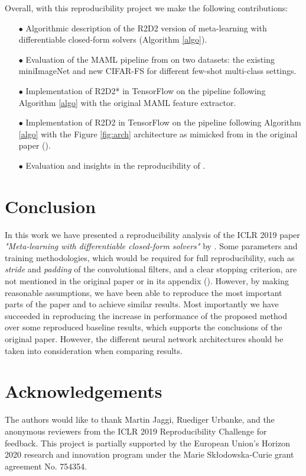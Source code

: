 Overall, with this reproducibility project we make the following contributions:
\begin{itemize}
\item[$\bullet$] Algorithmic description of the R2D2 version of meta-learning with differentiable closed-form solvers (Algorithm \ref{algo}).
\item[$\bullet$] Evaluation of the MAML pipeline from \citet{MAML} on two  datasets: the existing miniImageNet and new \textsc{CIFAR-FS} for different few-shot multi-class settings.
\item[$\bullet$] Implementation of R2D2* in TensorFlow on the pipeline following Algorithm \ref{algo} with the original MAML feature extractor.
\item[$\bullet$] Implementation of R2D2 in TensorFlow on the pipeline following Algorithm \ref{algo} with the Figure \ref{fig:arch} architecture as mimicked from in the original paper (\citet{R2D2}).
\item[$\bullet$] Evaluation and insights in the reproducibility of \citet{R2D2}.
\end{itemize}

\section{Conclusion}
\label{conc}
In this work we have presented a reproducibility analysis of the ICLR 2019 paper \textit{"Meta-learning with differentiable closed-form solvers"} by \citet{R2D2}. Some parameters and training methodologies, which would be required for full reproducibility, such as \textit{stride} and \textit{padding} of the convolutional filters, and a clear stopping criterion, are not mentioned in the original paper or in its appendix (\citet{R2D2}). However, by making reasonable assumptions, we have been able to reproduce the most important parts of the paper and to achieve similar results. Most importantly we have succeeded in reproducing the increase in performance of the proposed method over some reproduced baseline results, which supports the conclusions of the original paper. However, the different neural network architectures should be taken into consideration when comparing results.
\section*{Acknowledgements}
The authors would like to thank Martin Jaggi, Ruediger Urbanke, and the anonymous reviewers from the ICLR 2019 Reproducibility Challenge for feedback. This project is partially supported by the European Union’s Horizon 2020 research and innovation program under the Marie Skłodowska-Curie grant agreement No. 754354.
